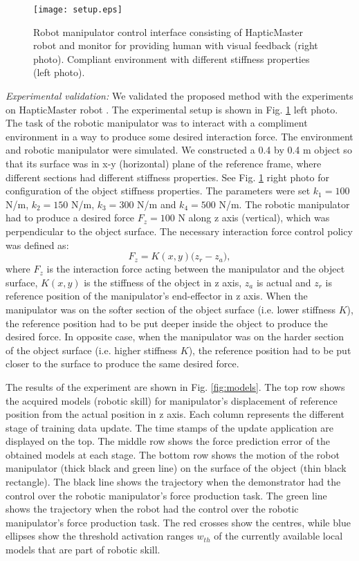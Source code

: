 \begin{figure}[!t]
	\centering
	\texttt{[image: setup.eps]}
	\caption{Robot manipulator control interface consisting of HapticMaster robot and monitor for providing human with visual feedback (right photo). Compliant environment with different stiffness properties (left photo).}
	\label{fig:setup}
\end{figure}

\textit{Experimental validation:} We validated the proposed method with the experiments on HapticMaster robot \cite{Linde2002}. The experimental setup is shown in Fig. \ref{fig:setup} left photo. The task of the robotic manipulator was to interact with a compliment environment in a way to produce some desired interaction force. The environment and robotic manipulator were simulated. We constructed a 0.4 by 0.4 m object so that its surface was in x-y (horizontal) plane of the reference frame, where different sections had different stiffness properties. See Fig. \ref{fig:setup} right photo for configuration of the object stiffness properties. The parameters were set $k_1=100$ N/m, $k_2=150$ N/m, $k_3=300$ N/m and $k_4=500$ N/m. The robotic manipulator had to produce a desired force $F_z=100$ N along z axis (vertical), which was perpendicular to the object surface. The necessary interaction force control policy was defined as:
\begin{equation}
F_{z} = K(x,y) \big(z_r-z_a\big),\label{en:robotimp}
\end{equation}
where $F_{z}$ is the interaction force acting between the manipulator and the object surface, $K(x,y)$ is the stiffness of the object in z axis, $z_a$ is actual and $z_r$ is reference position of the manipulator's end-effector in z axis. When the manipulator was on the softer section of the object surface (i.e. lower stiffness $K$), the reference position had to be put deeper inside the object to produce the desired force. In opposite case, when the manipulator was on the harder section of the object surface (i.e. higher stiffness $K$), the reference position had to be put closer to the surface to produce the same desired force.

The results of the experiment are shown in Fig. \ref{fig:models}. The top row shows the acquired models (robotic skill) for manipulator's displacement of reference position from the actual position in z axis. Each column represents the different stage of training data update. The time stamps of the update application are displayed on the top. The middle row shows the force prediction error of the obtained models at each stage. The bottom row shows the motion of the robot manipulator (thick black and green line) on the surface of the object (thin black rectangle). The black line shows the trajectory when the demonstrator had the control over the robotic manipulator's force production task. The green line shows the trajectory when the robot had the control over the robotic manipulator's force production task. The red crosses show the centres, while blue ellipses show the threshold activation ranges $w_{th}$ of the currently available local models that are part of robotic skill.

